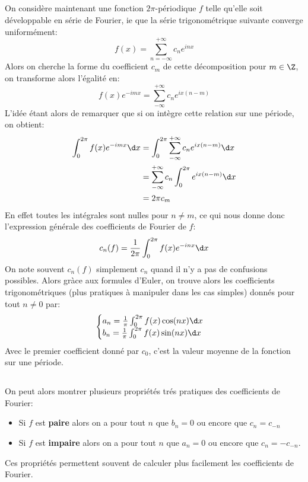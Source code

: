 \subsection*{}
On considère maintenant une fonction \(2\pi\)-périodique \(f\) telle qu'elle soit développable en série de Fourier, ie que la série trigonométrique suivante converge uniformément:
\[
   f(x) = \sum_{n = -\infty}^{+\infty} c_n e^{inx}   
\]
Alors on cherche la forme du coefficient \(c_m\) de cette décomposition pour \(m \in \Z\), on transforme alors l'égalité en:
\[
   f(x)e^{-imx} = \sum_{-\infty}^{+\infty} c_n e^{ix(n - m)}
\]
L'idée étant alors de remarquer que si on intègre cette relation sur une période, on obtient:
\begin{align*}
   \int_{0}^{2\pi} f(x)e^{-imx} \d x &= \int_{0}^{2\pi} \sum_{-\infty}^{+\infty} c_n e^{ix(n - m)} \d x \\
   & = \sum_{-\infty}^{+\infty} c_n \int_{0}^{2\pi} e^{ix(n - m)} \d x\\
   & = 2\pi c_m
\end{align*}
En effet toutes les intégrales sont nulles pour \(n \neq m\), ce qui nous donne donc l'expression générale des coefficients de Fourier de \(f\):
\[
   c_n(f) = \frac{1}{2\pi} \int_{0}^{2\pi} f(x)e^{-inx} \d x
\]
On note souvent \(c_n(f)\) simplement \(c_n\) quand il n'y a pas de confusions possibles. Alors gràce aux formules d'Euler, on trouve alors les coefficients trigonométriques (plus pratiques à manipuler dans les cas simples) donnés pour tout \(n \neq 0\) par:
\[
   \begin{cases}
      a_n = \frac{1}{\pi} \int_{0}^{2\pi} f(x)\cos(nx) \d x\\
      b_n = \frac{1}{\pi} \int_{0}^{2\pi} f(x)\sin(nx) \d x\\
   \end{cases}   
\]
Avec le premier coefficient donné par \(c_0\), c'est la valeur moyenne de la fonction sur une période.

\subsection*{}
On peut alors montrer plusieurs propriétés trés pratiques des coefficients de Fourier:
\begin{itemize}
   \item Si \(f\) est \textbf{paire} alors on a pour tout \(n\) que \(b_n = 0\) ou encore que \(c_n = c_{-n}\)
   \item Si \(f\) est \textbf{impaire} alors on a pour tout \(n\) que \(a_n = 0\) ou encore que \(c_n = -c_{-n}\).
\end{itemize}
Ces propriétés permettent souvent de calculer plus facilement les coefficients de Fourier.

